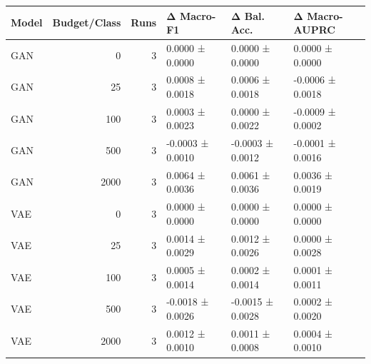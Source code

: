 \begin{tabular}{lrrlll}
\toprule
Model & Budget/Class & Runs & Δ Macro-F1 & Δ Bal. Acc. & Δ Macro-AUPRC \\
\midrule
GAN & 0 & 3 & 0.0000 ± 0.0000 & 0.0000 ± 0.0000 & 0.0000 ± 0.0000 \\
GAN & 25 & 3 & 0.0008 ± 0.0018 & 0.0006 ± 0.0018 & -0.0006 ± 0.0018 \\
GAN & 100 & 3 & 0.0003 ± 0.0023 & 0.0000 ± 0.0022 & -0.0009 ± 0.0002 \\
GAN & 500 & 3 & -0.0003 ± 0.0010 & -0.0003 ± 0.0012 & -0.0001 ± 0.0016 \\
GAN & 2000 & 3 & 0.0064 ± 0.0036 & 0.0061 ± 0.0036 & 0.0036 ± 0.0019 \\
VAE & 0 & 3 & 0.0000 ± 0.0000 & 0.0000 ± 0.0000 & 0.0000 ± 0.0000 \\
VAE & 25 & 3 & 0.0014 ± 0.0029 & 0.0012 ± 0.0026 & 0.0000 ± 0.0028 \\
VAE & 100 & 3 & 0.0005 ± 0.0014 & 0.0002 ± 0.0014 & 0.0001 ± 0.0011 \\
VAE & 500 & 3 & -0.0018 ± 0.0026 & -0.0015 ± 0.0028 & 0.0002 ± 0.0020 \\
VAE & 2000 & 3 & 0.0012 ± 0.0010 & 0.0011 ± 0.0008 & 0.0004 ± 0.0010 \\
\bottomrule
\end{tabular}
